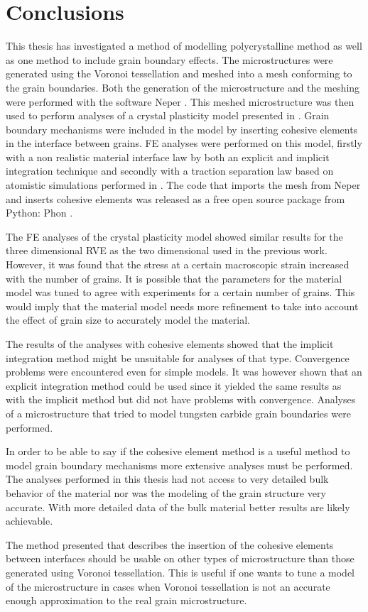 \documentclass[conclusion.tex]{subfiles}
\begin{document}
\FloatBarrier

\chapter{Conclusions}


This thesis has investigated a method of modelling polycrystalline method as well as one method to include grain boundary effects. The microstructures were generated using the Voronoi tessellation and meshed into a mesh conforming to the grain boundaries. Both the generation of the microstructure and the meshing were performed with the software Neper \cite{Quey20111729}. This meshed microstructure was then used to perform analyses of a crystal plasticity model presented in \cite{lillekh}. Grain boundary mechanisms were included in the model by inserting cohesive elements in the interface between grains. FE analyses were performed on this model, firstly with a non realistic material interface law by both an explicit and implicit integration technique and secondly with a traction separation law based on atomistic simulations performed in \cite{Gren2013}. The code that imports the mesh from Neper and inserts cohesive elements was released as a free open source package from Python: Phon \cite{Phon}.

The FE analyses of the crystal plasticity model showed similar results for the three dimensional RVE as the two dimensional used in the previous work. However, it was found that the stress at a certain macroscopic strain increased with the number of grains. It is possible that the parameters for the material model was tuned to agree with experiments for a certain number of grains. This would imply that the material model needs more refinement to take into account the effect of grain size to accurately model the material.

The results of the analyses with cohesive elements showed that the implicit integration method might be unsuitable for analyses of that type. Convergence problems were encountered even for simple models. It was however shown that an explicit integration method could be used since it yielded the same results as with the implicit method but did not have problems with convergence. Analyses of a microstructure that tried to model tungsten carbide grain boundaries were performed.

In order to be able to say if the cohesive element method is a useful method to model grain boundary mechanisms more extensive analyses must be performed. The analyses performed in this thesis had not access to very detailed bulk behavior of the material nor was the modeling of the grain structure very accurate. With more detailed data of the bulk material better results are likely achievable.

 The method presented that describes the insertion of the cohesive elements between interfaces should be usable on other types of microstructure than those generated using Voronoi tessellation. This is useful if one wants to tune a model of the microstructure in cases when Voronoi tessellation is not an accurate enough approximation to the real grain microstructure.
\end{document}
